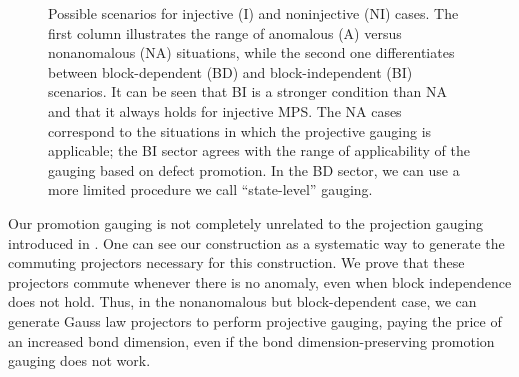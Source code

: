 \documentclass[reprint,
superscriptaddress,
amsmath,amssymb,
notitlepage,
aps,
prb,
10pt, 
tightenlines
]{revtex4-2}
\begin{document}
\begin{figure}
    \caption{Possible scenarios for injective (I) and noninjective (NI) cases. The first column illustrates the range of anomalous (A) versus nonanomalous (NA) situations, while the second one differentiates between block-dependent (BD) and block-independent (BI) scenarios. It can be seen that BI is a stronger condition than NA and that it always holds for injective MPS. The NA cases correspond to the situations in which the projective gauging is applicable; the BI sector agrees with the range of applicability of the gauging based on defect promotion. In the BD sector, we can use a more limited procedure we call ``state-level'' gauging.}
    \label{fig:summary}
\end{figure}

Our promotion gauging is not completely unrelated to the projection gauging introduced in \cite{PhysRevX.5.011024}. One can see our construction as a systematic way to generate the commuting projectors necessary for this construction. We prove that these projectors commute whenever there is no anomaly, even when block independence does not hold. Thus, in the nonanomalous but block-dependent case, we can generate Gauss law projectors to perform projective gauging, paying the price of an increased bond dimension, even if the bond dimension-preserving promotion gauging does not work.
\end{document}
